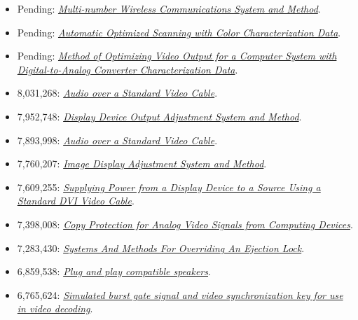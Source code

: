 \documentclass[10pt,letterpaper,oneside]{report}
\begin{document}
\begin{itemize}
  \item Pending: \href{http://voltz.ws/resume/20070099638.pdf}
    {\textit{Multi-number Wireless Communications System and Method}}.

  \item Pending: \href{http://voltz.ws/resume/20030123723.pdf}
    {\textit{Automatic Optimized Scanning with Color Characterization Data}}.

  \item Pending: \href{http://voltz.ws/resume/20030122840.pdf}
    {\textit{Method of Optimizing Video Output for a Computer System with
    Digital-to-Analog Converter Characterization Data}}.

  \item 8,031,268: \href{http://voltz.ws/resume/8031268.pdf}
    {\textit{Audio over a Standard Video Cable}}.

  \item 7,952,748: \href{http://voltz.ws/resume/7952748.pdf}
    {\textit{Display Device Output Adjustment System and Method}}.

  \item 7,893,998: \href{http://voltz.ws/resume/7893998.pdf}
    {\textit{Audio over a Standard Video Cable}}.

  \item 7,760,207: \href{http://voltz.ws/resume/7760207.pdf}
    {\textit{Image Display Adjustment System and Method}}.

  \item 7,609,255: \href{http://voltz.ws/resume/7609255.pdf}
    {\textit{Supplying Power from a Display Device to a Source Using a Standard
    DVI Video Cable}}.

  \item 7,398,008: \href{http://voltz.ws/resume/7398008.pdf}
    {\textit{Copy Protection for Analog Video Signals from Computing Devices}}.

  \item 7,283,430: \href{http://voltz.ws/resume/7283430.pdf}
    {\textit{Systems And Methods For Overriding An Ejection Lock}}.

  \item 6,859,538: \href{http://voltz.ws/resume/6859538.pdf}
    {\textit{Plug and play compatible speakers}}.

  \item 6,765,624: \href{http://voltz.ws/resume/6765624.pdf}
    {\textit{Simulated burst gate signal and video synchronization key for use
    in video decoding}}.


\end{itemize}
\end{document}
